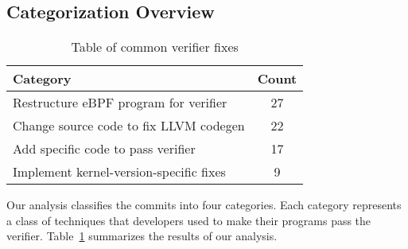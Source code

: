 \subsection{Categorization Overview}

\begin{table}[t]
    \small
    \centering
    \begin{tabular}{lc}%
        \toprule
        \textbf{Category} & \textbf{Count} \\
        \midrule
        Restructure eBPF program for verifier & 27 \\           %
        Change source code to fix LLVM codegen & 22 \\          %
        Add specific code to pass verifier & 17 \\              %
        Implement kernel-version-specific fixes & 9 \\          %
        \bottomrule
    \end{tabular}
    \caption{Table of common verifier fixes} %
    \vspace{-20pt}
    \label{fig:commit-table}
\end{table}

Our analysis classifies the commits into four categories.
Each category represents a class of techniques that developers used to make their programs pass the verifier.
Table~\ref{fig:commit-table} summarizes the results of our analysis.


